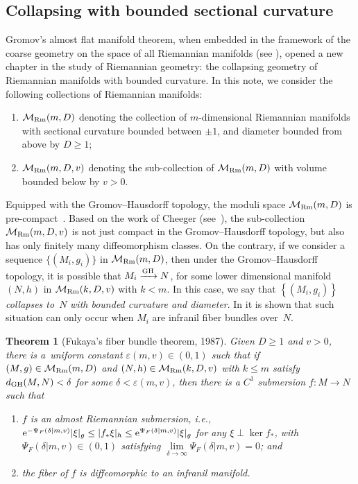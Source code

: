 \documentclass[10pt,a4paper]{amsart}
\numberwithin{equation}{section}
\newtheorem{Theorem}{Theorem}[section]
\begin{document}
\subsection{Collapsing with bounded sectional curvature}\label{section2.1}
Gromov's almost flat manifold theorem, when embedded in the framework of the
coarse geometry on the space of all Riemannian manifolds (see \cite{GLP}),
opened a new chapter in the study of Riemannian geometry: the collapsing
geometry of Riemannian manifolds with bounded curvature. In this note, we
consider the following collections of Riemannian manifolds:
\begin{enumerate}\itemsep=0pt
\item[1)] $\mathcal{M}_{\rm Rm}(m,D)$ denoting the collection of $m$-dimensional
Riemannian manifolds with sectional curvature bounded between $\pm 1$,
and diameter bounded from above by $D\ge 1$;
\item[2)] $\mathcal{M}_{\rm Rm}(m,D,v)$ denoting the sub-collection of
$\mathcal{M}_{\rm Rm}(m,D)$ with volume bounded below by $v>0$.
 \end{enumerate}
 Equipped with the Gromov--Hausdorff
 topology, the moduli space $\mathcal{M}_{\rm Rm}(m,D)$ is pre-com\-pact~\cite{GLP}.
 Based on the work of Cheeger (see~\cite{Cheeger70, GreenWu}), the
 sub-collection $\mathcal{M}_{\rm Rm}(m,D,v)$ is not just compact in the
 Gromov--Hausdorff topology, but also has only finitely many diffeomorphism
 classes. On the contrary, if we consider a sequence $\{(M_i,g_i)\}$
 in $\mathcal{M}_{\rm Rm}(m,D)$, then under the Gromov--Hausdorff topology, it is
 possible that $M_i\xrightarrow{\rm GH} N$, for some lower dimensional manifold
 $(N,h)$ in $\mathcal{M}_{\rm Rm}(k,D,v)$ with $k<m$. In this case, we say that
 $\left\{(M_i,g_i)\right\}$ \emph{collapses to}~$N$ \emph{with bounded curvature
 and diameter}. In \cite{Fukaya87ld} it is shown that such situation
 can only occur when $M_i$ are infranil fiber bundles over~$N$.
 \begin{Theorem}[Fukaya's fiber bundle theorem, 1987]\label{thm: Fukaya1}
 Given $D\ge 1$ and $v>0$, there is a~uniform constant $\varepsilon(m,v)\in
 (0,1)$ such that if $(M,g)\in \mathcal{M}_{\rm Rm}(m,D)$ and $(N,h)\in
 \mathcal{M}_{\rm Rm}(k,D,v)$ with $k\le m$ satisfy $d_{\rm GH}(M,N)<\delta$ for some
 $\delta<\varepsilon(m,v)$, then there is a $C^1$ submersion $f\colon M\to N$ such
 that
 \begin{enumerate}\itemsep=0pt
 \item[$1)$] $f$ is an almost Riemannian submersion, i.e., ${\rm e}^{-\Psi_F(\delta|m,v)}|\xi|_g \le
|f_{\ast}\xi|_h\le {\rm e}^{\Psi_F(\delta|m,v)}|\xi|_g$ for any $\xi\perp
\ker f_{\ast}$, with $\Psi_F(\delta|m,v)\in (0,1)$ satisfying $\lim\limits_{\delta
\to \infty} \Psi_F(\delta|m,v)=0$; and
\item[$2)$] the fiber of $f$ is diffeomorphic to an infranil manifold.
 \end{enumerate}
 \end{Theorem}
\end{document}
